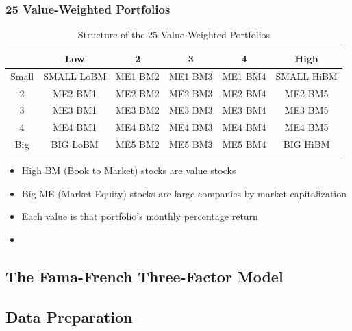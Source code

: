 \documentclass{beamer}
\begin{document}
\begin{frame}
\frametitle{25 Value-Weighted Portfolios}
\begin{table}
\centering
\resizebox{\textwidth}{!}
{\begin{tabular}{ | c | c | c | c | c | c | }
\hline
 & Low & 2 & 3 & 4 & High \\ \hline
Small & SMALL LoBM & ME1 BM2 & ME1 BM3 & ME1 BM4 & SMALL HiBM\\ \hline
2 & ME2 BM1 & ME2 BM2 & ME2 BM3 & ME2 BM4 & ME2 BM5\\ \hline
3 & ME3 BM1 & ME3 BM2 & ME3 BM3 & ME3 BM4 & ME3 BM5\\ \hline
4 & ME4 BM1 & ME4 BM2 & ME4 BM3 & ME4 BM4 & ME4 BM5\\ \hline
Big & BIG LoBM & ME5 BM2 & ME5 BM3 & ME5 BM4 & BIG HiBM\\ \hline
\end{tabular}}
\caption{Structure of the 25 Value-Weighted Portfolios}
\end{table}%
\begin{itemize}
\item High BM (Book to Market) stocks are value stocks
\item Big ME (Market Equity) stocks are large companies by market capitalization
\item Each value is that portfolio's monthly percentage return 
\item 


\end{itemize}


\end{frame}


\subsection{The Fama-French Three-Factor Model}

\subsection{Data Preparation}
\end{document}
